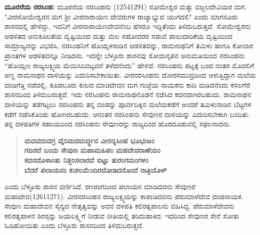 \textbf{ಮೂರನೆಯ ನರಸಿಂಹ: } ಮೂರನೆಯ ನರಸಿಂಹನು (1254\enginline{-}1291) ಸೋಮೇಶ್ವರ ಮತ್ತು ಬಿಜ್ಜಲದೇವಿಯರ ಮಗ. "ವೀರಸೋಮೇಶ್ವರನ ಮಗ ಶ‍್ರೀ ವೀರನಾರಾಯಣ ದೇವರುಗಳ ರಾಜ್ಯಾಭ್ಯುದ ಯುಗದಲಿ" ಎಂದು ಮಾಗನೂರು ಶಾಸನದಲ್ಲಿ ಹೇಳಿದ್ದು, ಇವನಿಗೆ ವೀರನಾರಾಯಣದೇವನೆಂಬ ಹೆಸರೂ ಇದ್ದಿತೆಂದು ತಿಳಿದುಬರುತ್ತದೆ. ಸೋಮೇಶ್ವರನು ಆಡಳಿತದ ಅನುಕೂಲತೆಯ ದೃಷ್ಟಿಯಿಂದ ಮತ್ತು ಮಲ ಸಹೋದರರ ನಡುವೆ ಪಾಲುದಾರಿಕೆಯ ದೃಷ್ಟಿಯಿಂದ ಸಾಮ್ರಾಜ್ಯವನ್ನು ವಿಭಜಿಸಿ, ನರಸಿಂಹನಿಗೆ ಹೊಯ್ಸಳನಾಡಿನ ಆಡಳಿತವನ್ನು, ರಾಮನಾಥನಿಗೆ ತಮಿಳು ಹಾಗೂ ಕೋಲಾರ ಪ್ರಾಂತಗಳ ಆಡಳಿತವನ್ನೂ ನೀಡಿದನು. ಇದನ್ನೇ ಬೆಳ್ಳೂರು ಶಾಸನವು ಸೋಮನೃಪನ ಅನುಮತಿಯಿಂದ ನರಸಿಂಹನು “ಹೊಯ್ಸಣ ರಾಜ್ಯಲಕ್ಷ್ಮಿಯ ಮೆಯಿಸಿರಿವಟ್ಟವನೆ ತಳೆದನೆಂದು” ಹೇಳಿದೆ. ನರಸಿಂಹನು ಪಟ್ಟಕ್ಕೆ ಬಂದ ನಂತರ ಮೊದಲಿಗೆ ಅಣ್ಣ ರಾಮನಾಥನ ದಾಳಿಯನ್ನು ಎದುರಿಸಬೇಕಾಯಿತು. ವೀರನರಸಿಂಹನು ದೋರಸಮುದ್ರದಿಂದ ಆಳುತ್ತಿದ್ದಾಗ ಮಲೆಯ ದಂಡಿಗೆತ್ತಿ ನಡೆದಲ್ಲಿ, ಕೂಡಲೂರು ಕುಲದ ಮಾಚಿದೇವನ ಮಗ ಗುಜ್ಜೆಯ ನಾಯಕನು ಕಾದಿ ಮಡಿದನೆಂದು ಕಸಲಗೆರೆ ಶಾಸನದಿಂದ ತಿಳಿದುಬರುತ್ತದೆ. ಇದು ನರಸಿಂಹನು ರಾಮನಾಥನೊಡನೆ ನಡೆಸಿದ ಕದನವಾಗಿರಬಹುದು. ರಾಮನಾಥನ ದಾಳಿಯನ್ನು ತಡೆಗಟ್ಟಲು ನರಸಿಂಹನು ತನ್ನ ದಂಡನ್ನು ಪೂರ್ವದಿಕ್ಕಿನ ಮಲೆಯಕಡೆಗೆ ಅಂದರೆ ತಮಿಳುನಾಡಿನ ಬೆಟ್ಟಗಳ ಕಡೆಗೆ ನಡೆಸಿಕೊಂಡು ಹೋಗಿರಬಹುದು. ಆನಂತರ ನರಸಿಂಹನು ಸೇವುಣರ ದಾಳಿಯನ್ನು ಎದುರಿಸಬೇಕಾಗಿ ಬಂದಿತು. ತನ್ನ ದಳಪತಿಗಳ ಸಹಾಯದಿಂದ ನರಸಿಂಹನು ಸೇವುಣರನ್ನು ರಾಜ್ಯದಿಂದ ಹೊರದೂಡುವಲ್ಲಿ ಸಫಲನಾದನು.

\begin{verse}
\textbf{ಮದವದುದಗ್ರ ವೈರಿಮದಮರ್ದ್ಧನ ವೀರನೃಸಿಂಹ ಭೂಭುಜಂ} \\\textbf{ಗದಿರದೆ ಬಂದು ಸೇವುಣ ಮಹಾಮಹಿಪಂ ಮಹದೇವರಾಣೆಯಂ} \\\textbf{ಕದನದೊಳಾಂತು ನಿತ್ತರಿಸಲಾರದೆ ಬಿಟ್ಟು ತುರಂಗಮಂಗಳಂ} \\\textbf{ಬೆದರೆ ಪಲಾಯನಂ ಕುಶಲಮೆಂದಿರದೋಡಿದನೊಂದೆ ರಾತ್ರಿಯೊಳ್​}
\end{verse}

ಎಂದು ಬೆಳ್ಳೂರು ಶಾಸನ ವರ್ಣಿಸಿದೆ. ರಣರಂಗದಿಂದ ಪಲಾಯನ ಮಾಡಿದವನು ಸೇವುಣರ ಮಹಾದೇವ(1261\enginline{-}1271). ವೀರನರಸಿಂಹನ ರಾಜ್ಯಲಕ್ಷ್ಮಿಯನ್ನು ಕಾಪಾಡಿದವನು ಪೆರುಮಾಳೆದೇವ ದಂಡನಾಯಕ. ಸೇವುಣ ಮಹಾದೇವನ ಸೈನ್ಯದ ನೇತೃತ್ವವನ್ನು ಅವನ ದಳಪತಿ ಕಲಿರತ್ನಪಾಲನು ವಹಿಸಿದ್ದ. ಪೆರುಮಾಳೆದೇವನು ಕಲಿರತ್ನಪಾಳನ ಶಿರಸ್ಸನ್ನು ಜಯಲಕ್ಷ್ಮಿಗೆ ನೀಡುವ ರೀತಿಯಲ್ಲಿ ತರಿದುಹಾಕಿದ. ಇದರಿಂದ ಸೇವುಣರ ಸೇನೆ ಸೋತು ಓಡಿಹೋಯಿತು ಎಂದು ಬೆಳ್ಳೂರು ಶಾಸನದಿಂದ ತಿಳಿದುಬರುತ್ತದೆ.


